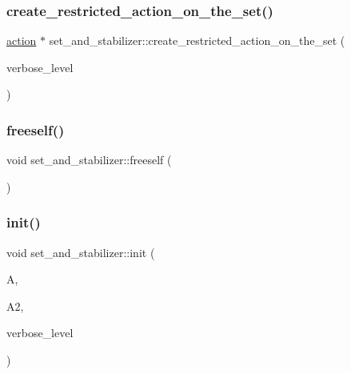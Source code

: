 \subsubsection{\texorpdfstring{create\+\_\+restricted\+\_\+action\+\_\+on\+\_\+the\+\_\+set()}{create\_restricted\_action\_on\_the\_set()}}
{\footnotesize\ttfamily \mbox{\hyperlink{classaction}{action}} $\ast$ set\+\_\+and\+\_\+stabilizer\+::create\+\_\+restricted\+\_\+action\+\_\+on\+\_\+the\+\_\+set (\begin{DoxyParamCaption}\item[{\mbox{\hyperlink{galois_8h_a09fddde158a3a20bd2dcadb609de11dc}{I\+NT}}}]{verbose\+\_\+level }\end{DoxyParamCaption})}

\mbox{\label{classset__and__stabilizer_a5be7372aa149d76d3d15aba5d12b1e48}} 
\subsubsection{\texorpdfstring{freeself()}{freeself()}}
{\footnotesize\ttfamily void set\+\_\+and\+\_\+stabilizer\+::freeself (\begin{DoxyParamCaption}{ }\end{DoxyParamCaption})}

\mbox{\label{classset__and__stabilizer_a9824acdea41591e8086e76aa8b2e4b53}} 
\subsubsection{\texorpdfstring{init()}{init()}}
{\footnotesize\ttfamily void set\+\_\+and\+\_\+stabilizer\+::init (\begin{DoxyParamCaption}\item[{\mbox{\hyperlink{classaction}{action}} $\ast$}]{A,  }\item[{\mbox{\hyperlink{classaction}{action}} $\ast$}]{A2,  }\item[{\mbox{\hyperlink{galois_8h_a09fddde158a3a20bd2dcadb609de11dc}{I\+NT}}}]{verbose\+\_\+level }\end{DoxyParamCaption})}


